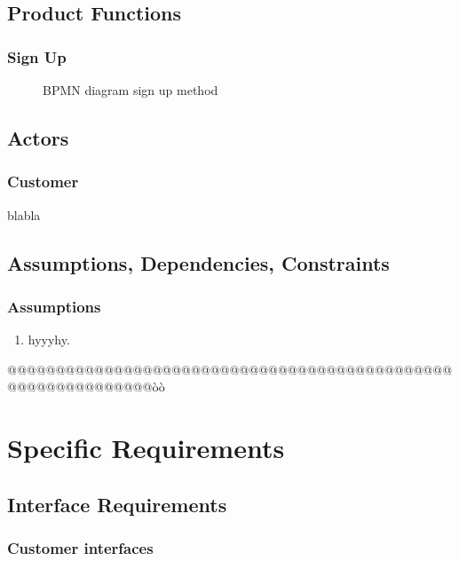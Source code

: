 \subsection{Product Functions}
\label{product_functions}

\subsubsection{Sign Up}
\label{sign_up}

\begin{figure}[H]
    \begin{center}
        \caption{BPMN diagram sign up method}
    \end{center}
\end{figure}


\subsection{Actors}
\subsubsection{Customer}
blabla

\subsection{Assumptions, Dependencies, Constraints}
\subsubsection{Assumptions}
\begin{enumerate}[label=\textbf{D\arabic*}:]
    \item hyyyhy.

\end{enumerate}

\newpage
@@@@@@@@@@@@@@@@@@@@@@@@@@@@@@@@@@@@@@@@@@@@@@@@@@@@@@@@@@@@@òò
\section{Specific Requirements}
\subsection{Interface Requirements}
\subsubsection{Customer interfaces}


